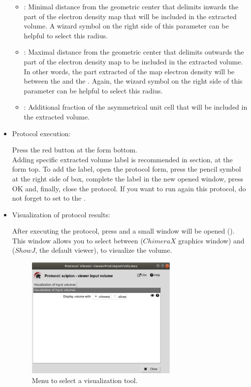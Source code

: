 \begin{itemize}
\begin{itemize}
  \item {}: Minimal distance from the geometric center that delimits inwards the part of the electron density map that will be included in the extracted volume. A wizard symbol on the right side of this parameter can be helpful to select this radius.
  \item {}: Maximal distance from the geometric center that delimits outwards the part of the electron density map to be included in the extracted volume. In other words, the part extracted of the map electron density will be between the  and the . Again, the wizard symbol on the right side of this parameter can be helpful to select this radius.  
  \item {}: Additional fraction of the asymmetrical unit cell that will be included in the extracted volume.
  \end{itemize}

  \item Protocol execution:
  
  Press the  red button at the form bottom.\\
  Adding specific extracted volume label is recommended in  section, at the form top. To add the label, open the protocol form, press the pencil symbol at the right side of  box, complete the label in the new opened window, press OK and, finally, close the protocol. If you want to run again this protocol, do not forget to set to  the .
  
  \item Visualization of protocol results:
  
  After executing the protocol, press  and a small window will be opened (). This window allows you to select between  ($ChimeraX$ graphics window) and  ($ShowJ$, the default \scipion viewer), to visualize the volume.
  
    \begin{figure}[H]
    \centering 
    \captionsetup{width=.7\linewidth} 
    \includegraphics[width=0.70\textwidth]{Images_appendix/Fig101.pdf}
    \caption{Menu to select a visualization tool.}
    \label{fig:app_protocol_volume_2}
   \end{figure}
   

\end{itemize}
